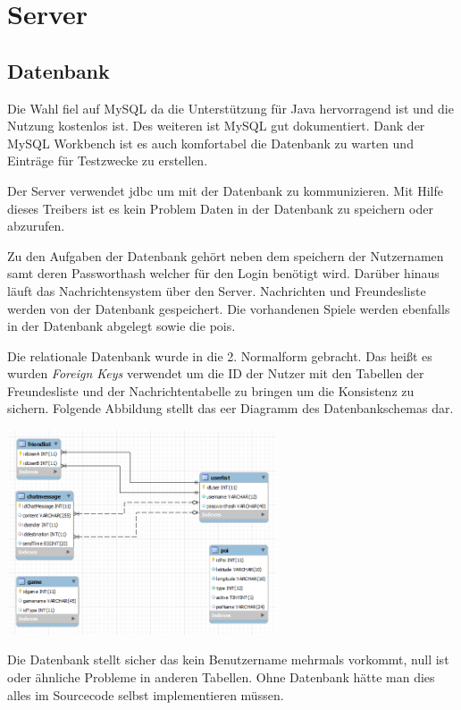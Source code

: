 \chapter{Server}
\section{Datenbank}
Die Wahl fiel auf MySQL da die Unterstützung für Java hervorragend ist und die Nutzung kostenlos ist. Des weiteren ist MySQL gut dokumentiert. Dank der MySQL Workbench ist es auch komfortabel die Datenbank zu warten und Einträge für Testzwecke zu erstellen.

Der Server verwendet \gls{jdbc} um mit der Datenbank zu kommunizieren. Mit Hilfe dieses Treibers ist es kein Problem Daten in der Datenbank zu speichern oder abzurufen.

Zu den Aufgaben der Datenbank gehört neben dem speichern der Nutzernamen samt deren Passworthash welcher für den Login benötigt wird. Darüber hinaus 
läuft das Nachrichtensystem über den Server. Nachrichten und Freundesliste werden von der Datenbank gespeichert. Die vorhandenen Spiele werden ebenfalls in der Datenbank abgelegt sowie die \glspl{poi}.

Die relationale Datenbank wurde in die 2. Normalform gebracht. Das heißt es wurden \textit{Foreign Keys} verwendet um die ID der Nutzer mit den Tabellen der Freundesliste und der Nachrichtentabelle zu bringen um die Konsistenz zu sichern. Folgende Abbildung stellt das \gls{eer} Diagramm des Datenbankschemas dar.

\begin{capfigure}
	\includegraphics[width=8cm]{images/server/eer}
\end{capfigure}

Die Datenbank stellt sicher das kein Benutzername mehrmals vorkommt,  null ist oder ähnliche Probleme in anderen Tabellen. Ohne Datenbank hätte man dies alles im Sourcecode selbst implementieren müssen.

